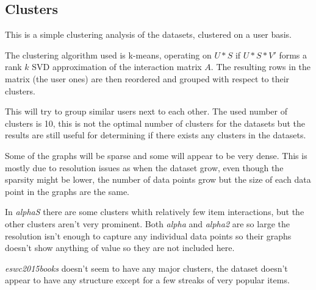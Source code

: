 

\subsection{Clusters}\label{sec:result:clusters}

This is a simple clustering analysis of the datasets, clustered on a user basis.

The clustering algorithm used is k-means, operating on $U * S$ if $U * S * V'$ forms a rank $k$ SVD approximation of the interaction matrix $A$. The resulting rows in the matrix (the user ones) are then reordered and grouped with respect to their clusters.

This will try to group similar users next to each other. The used number of clusters is 10, this is not the optimal number of clusters for the datasets but the results are still useful for determining if there exists any clusters in the datasets.

Some of the graphs will be sparse and some will appear to be very dense. This is mostly due to resolution issues as when the dataset grow, even though the sparsity might be lower, the number of data points grow but the size of each data point in the graphs are the same.

\FloatBarrier


In \textit{alphaS} there are some clusters whith relatively few item interactions, but the other clusters aren't very prominent. Both \textit{alpha} and \textit{alpha2} are so large the resolution isn't enough to capture any individual data points so their graphs doesn't show anything of value so they are not included here.


\FloatBarrier

\textit{eswc2015books} doesn't seem to have any major clusters, the dataset doesn't appear to have any structure except for a few streaks of very popular items.

\FloatBarrier



